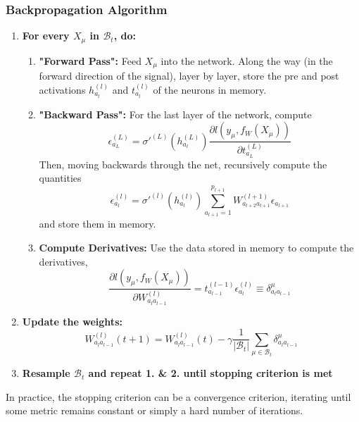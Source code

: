 \documentclass{article}
\begin{document}
\subsubsection*{Backpropagation Algorithm}
\begin{enumerate}
    \item \textbf{For every $X_{\mu}$ in $\mathcal{B}_t$, do:}
    \begin{enumerate}
        \item \textbf{"Forward Pass":}
        Feed $X_{\mu}$ into the network. Along the way (in the forward direction of the signal), layer by layer, store the pre and post activations $h^{(l)}_{a_l}$ and $t^{(l)}_{a_l}$ of the neurons in memory.
        \item \textbf{"Backward Pass":}
        For the last layer of the network, compute
        \begin{equation}
            \epsilon^{(L)}_{a_{L}}
            =
            \sigma'^{(L)} (h^{(L)}_{a_l})
            \frac{\partial l(y_{\mu}, f_W(X_{\mu}))}{\partial t^{(L)}_{a_L}}
        \end{equation}
        Then, moving backwards through the net, recursively compute the quantities
        \begin{equation}
            \epsilon^{(l)}_{a_{l}}
            =
            \sigma'^{(l)} (h^{(l)}_{a_l})
            \sum_{a_{l+1}=1}^{p_{l+1}}
            W^{(l+1)}_{a_{l+2} a_{l+1}}
            \epsilon_{a_{l+1}}
        \end{equation}
        and store them in memory.
        \item \textbf{Compute Derivatives:}
        Use the data stored in memory to compute the derivatives,
        \begin{equation}
            \frac{\partial l(y_{\mu}, f_W(X_{\mu}))}{\partial W^{(l)}_{a_l a_{l-1}}}
            =
            t^{(l-1)}_{a_{l-1}}
            \epsilon^{(l)}_{a_{l}}
            \equiv
            \delta_{a_l a_{l-1}}^{\mu}
        \end{equation}
    \end{enumerate}
    \item \textbf{Update the weights:}
    \begin{equation}
        W^{(l)}_{a_l a_{l-1}} (t+1)
            =
            W^{(l)}_{a_l a_{l-1}} (t)
            - \gamma \frac{1}{|\mathcal{B}_t|}
            \sum_{\mu \in \mathcal{B}_t}
            \delta_{a_l a_{l-1}}^{\mu}
    \end{equation}
    \item \textbf{Resample $\mathcal{B}_t$ and repeat 1. \& 2. until stopping criterion is met}
\end{enumerate}
In practice, the stopping criterion can be a convergence criterion, iterating until some metric remains constant or simply a hard number of iterations.
\end{document}
